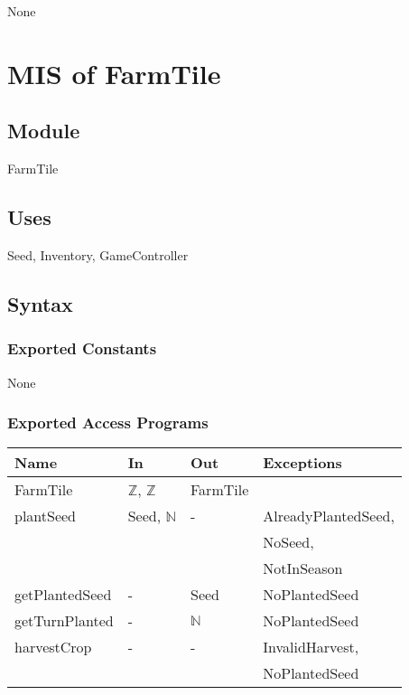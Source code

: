 \documentclass[12pt, titlepage]{article}
\begin{document}
None
  
\medskip
\newpage

\section{MIS of FarmTile} \label{FarmTile} 

\subsection{Module}

FarmTile

\subsection{Uses}

Seed, Inventory, GameController

\subsection{Syntax}

\subsubsection{Exported Constants}

None

\subsubsection{Exported Access Programs}

\begin{center}
\begin{tabular}{p{4cm} p{4cm} p{4cm} p{4cm}}
\hline
\textbf{Name} & \textbf{In} & \textbf{Out} & \textbf{Exceptions} \\
\hline
FarmTile & $\mathbb{Z}$, $\mathbb{Z}$ & FarmTile &  \\
\hline
plantSeed & Seed, $\mathbb{N}$ & - & AlreadyPlantedSeed, \\&&& NoSeed, \\&&& NotInSeason  \\
\hline
getPlantedSeed & - & Seed & NoPlantedSeed \\
\hline
getTurnPlanted & - & $\mathbb{N}$ & NoPlantedSeed \\
\hline
harvestCrop & - & - & InvalidHarvest, \\&&&NoPlantedSeed \\
\hline
\end{tabular}
\end{center}
\end{document}
